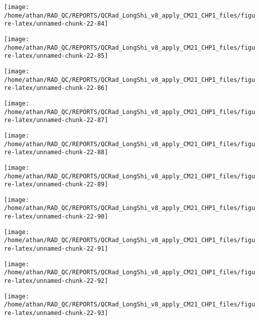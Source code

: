 \documentclass[
  10pt,
  a4paper,oneside]{article}
\begin{document}
\begin{center}\texttt{[image: /home/athan/RAD\_QC/REPORTS/QCRad\_LongShi\_v8\_apply\_CM21\_CHP1\_files/figure-latex/unnamed-chunk-22-84]} \end{center}

\begin{center}\texttt{[image: /home/athan/RAD\_QC/REPORTS/QCRad\_LongShi\_v8\_apply\_CM21\_CHP1\_files/figure-latex/unnamed-chunk-22-85]} \end{center}

\begin{center}\texttt{[image: /home/athan/RAD\_QC/REPORTS/QCRad\_LongShi\_v8\_apply\_CM21\_CHP1\_files/figure-latex/unnamed-chunk-22-86]} \end{center}

\begin{center}\texttt{[image: /home/athan/RAD\_QC/REPORTS/QCRad\_LongShi\_v8\_apply\_CM21\_CHP1\_files/figure-latex/unnamed-chunk-22-87]} \end{center}

\begin{center}\texttt{[image: /home/athan/RAD\_QC/REPORTS/QCRad\_LongShi\_v8\_apply\_CM21\_CHP1\_files/figure-latex/unnamed-chunk-22-88]} \end{center}

\begin{center}\texttt{[image: /home/athan/RAD\_QC/REPORTS/QCRad\_LongShi\_v8\_apply\_CM21\_CHP1\_files/figure-latex/unnamed-chunk-22-89]} \end{center}

\begin{center}\texttt{[image: /home/athan/RAD\_QC/REPORTS/QCRad\_LongShi\_v8\_apply\_CM21\_CHP1\_files/figure-latex/unnamed-chunk-22-90]} \end{center}

\begin{center}\texttt{[image: /home/athan/RAD\_QC/REPORTS/QCRad\_LongShi\_v8\_apply\_CM21\_CHP1\_files/figure-latex/unnamed-chunk-22-91]} \end{center}

\begin{center}\texttt{[image: /home/athan/RAD\_QC/REPORTS/QCRad\_LongShi\_v8\_apply\_CM21\_CHP1\_files/figure-latex/unnamed-chunk-22-92]} \end{center}

\begin{center}\texttt{[image: /home/athan/RAD\_QC/REPORTS/QCRad\_LongShi\_v8\_apply\_CM21\_CHP1\_files/figure-latex/unnamed-chunk-22-93]} \end{center}
\end{document}
